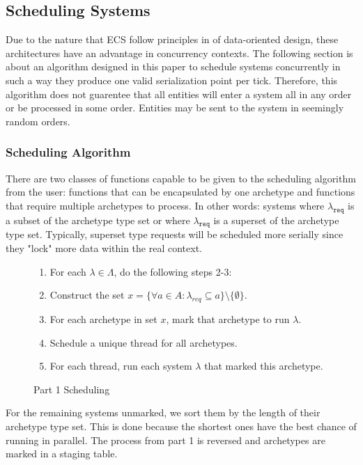 \subsection{Scheduling Systems}
\label{sec:scheduling}

Due to the nature that ECS follow principles in of data-oriented design, these architectures have an advantage in concurrency contexts. The following section is about an algorithm designed in this paper to schedule systems concurrently in such a way they produce one valid serialization point per tick. Therefore, this algorithm does not guarentee that all entities will enter a system all in any order or be processed in some order. Entities may be sent to the system in seemingly random orders.

\subsubsection{Scheduling Algorithm}
There are two classes of functions capable to be given to the scheduling algorithm from the user: functions that can be encapsulated by one archetype and functions that require multiple archetypes to process. In other words: systems where $\lambda_{\texttt{req}}$ is a subset of the archetype type set or where $\lambda_{\texttt{req}}$ is a superset of the archetype type set. Typically, superset type requests will be scheduled more serially since they "lock" more data within the real context. 

\begin{figure}[H]
    \begin{enumerate}
        \item For each $\lambda \in \Lambda$, do the following steps 2-3:
        \item Construct the set $x = \{\forall a \in A : \lambda_{req} \subseteq a \} \setminus \{\emptyset\}$.
        \item For each archetype in set $x$, mark that archetype to run $\lambda$.
        \item Schedule a unique thread for all archetypes.
        \item For each thread, run each system $\lambda$ that marked this archetype.
    \end{enumerate}
    \caption{Part 1 Scheduling}
\end{figure}

For the remaining systems unmarked, we sort them by the length of their archetype type set. This is done because the shortest ones have the best chance of running in parallel. The process from part 1 is reversed and archetypes are marked in a staging table. 

